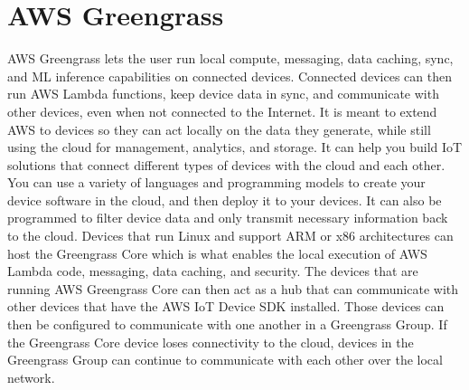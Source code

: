 \section{AWS Greengrass}

AWS Greengrass \cite{hid-sp18-521-Greengrass} lets the user run local compute, 
messaging, data caching, sync, and ML inference capabilities on connected
devices. Connected devices can then run AWS Lambda functions, keep device 
data in sync, and communicate with other devices, even when not connected
to the Internet. It is meant to extend AWS to devices so they can act 
locally on the data they generate, while still using the cloud for 
management, analytics, and storage. It can help you build IoT solutions 
that connect different types of devices with the cloud and each other. 
You can use a variety of languages and programming models to create your 
device software in the cloud, and then deploy it to your devices. It can 
also be programmed to filter device data and only transmit necessary 
information back to the cloud. Devices that run Linux and support ARM or 
x86 architectures can host the Greengrass Core which is what enables the
local execution of AWS Lambda code, messaging, data caching, and security.
The devices that are running AWS Greengrass Core can then act as a hub that 
can communicate with other devices that have the AWS IoT Device SDK 
installed. Those devices can then be configured to communicate with one 
another in a Greengrass Group. If the Greengrass Core device loses 
connectivity to the cloud, devices in the Greengrass Group can continue 
to communicate with each other over the local network. 
